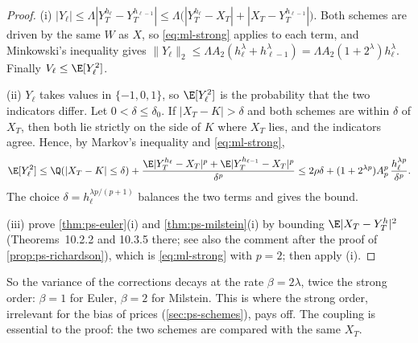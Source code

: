 \begin{proof}
(i) $|Y_\ell|\le\Lambda|Y^{h_\ell}_T-Y^{h_{\ell-1}}_T|\le\Lambda\big(|Y^{h_\ell}_T-X_T|+|X_T-Y^{h_{\ell-1}}_T|\big)$.
Both schemes are driven by the same $W$ as $X$, so \eqref{eq:ml-strong} applies to each
term, and Minkowski's inequality gives
$\|Y_\ell\|_2\le\Lambda A_2(h_\ell^\lambda+h_{\ell-1}^\lambda)=\Lambda A_2(1+2^\lambda)h_\ell^\lambda$.
Finally $V_\ell\le\E[Y_\ell^2]$.

(ii) $Y_\ell$ takes values in $\{-1,0,1\}$, so $\E[Y^2_\ell]$ is the probability that the two
indicators differ. Let $0<\delta\le\delta_0$. If $|X_T-K|>\delta$ and both schemes are within
$\delta$ of $X_T$, then both lie strictly on the side of $K$ where $X_T$ lies, and the
indicators agree. Hence, by Markov's inequality and \eqref{eq:ml-strong},
\[
  \E[Y^2_\ell]\le\Q(|X_T-K|\le\delta)+\frac{\E|Y^{h_\ell}_T-X_T|^p+\E|Y^{h_{\ell-1}}_T-X_T|^p}{\delta^p}
  \le2\rho\delta+(1+2^{\lambda p})A_p^p\,\frac{h_\ell^{\lambda p}}{\delta^p}.
\]
The choice $\delta=h_\ell^{\lambda p/(p+1)}$ balances the two terms and gives the bound.

(iii)  prove \cref{thm:ps-euler}(i) and \cref{thm:ps-milstein}(i) by
bounding $\E|X_T-Y^h_T|^2$ (Theorems~10.2.2 and 10.3.5 there; see also the comment after
the proof of \cref{prop:ps-richardson}), which is \eqref{eq:ml-strong} with $p=2$; then apply (i).
\end{proof}

So the variance of the corrections decays at the rate $\beta=2\lambda$, twice the strong order:
$\beta=1$ for Euler, $\beta=2$ for Milstein. This is where the strong order, irrelevant for the
bias of prices (\cref{sec:ps-schemes}), pays off. The coupling is essential to the proof: the
two schemes are compared with the same $X_T$.

